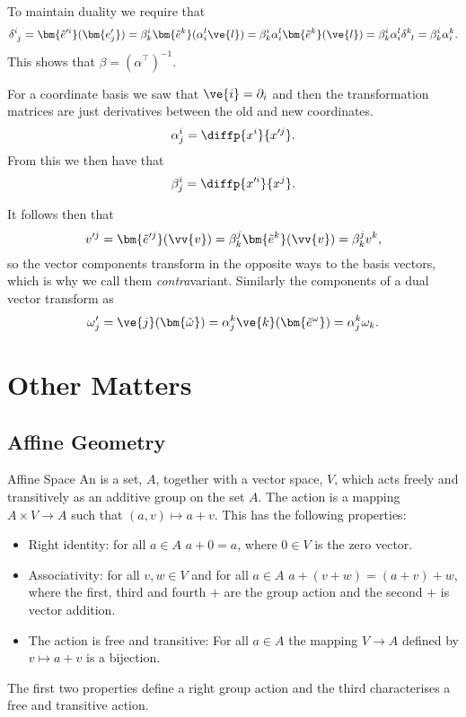\documentclass[fleqn]{NotesClass}
\newcommand*{\cv}[1]{\bm{\tilde{#1}}}
\newcommand*{\cve}[1]{\bm{\tilde{e}^{#1}}}
\newcommand*{\vep}[1]{\bm{e'_{#1}}}
\newcommand*{\cvep}[1]{\bm{\tilde{e}'^{#1}}}
\newcommand*{\trans}{\top}
\begin{document}
    To maintain duality we require that
    \begin{equation}
        \tensor{\delta}{^i_j} = \cvep{i}(\vep{j}) = \beta^i_k\cve{k}(\alpha^l_i\ve{l}) = \beta^i_k \alpha^l_i\cve{k}(\ve{l}) = \beta^i_k\alpha^l_i \tensor{\delta}{^k_l} = \beta^i_k\alpha^k_i.
    \end{equation}
    This shows that \(\beta = (\alpha^\trans)^{-1}\).
    
    For a coordinate basis we saw that \(\ve{i} = \partial_i\) and then the transformation matrices are just derivatives between the old and new coordinates.
    \begin{equation}
        \alpha^i_j = \diffp{x^i}{x'^j}.
    \end{equation}
    From this we then have that
    \begin{equation}
        \beta^i_j = \diffp{x'^i}{x^j}.
    \end{equation}
    
    It follows then that
    \begin{equation}
        v'^j = \cvep{j}(\vv{v}) = \beta^j_k \cve{k}(\vv{v}) = \beta^j_k v^k,
    \end{equation}
    so the vector components transform in the opposite ways to the basis vectors, which is why we call them \emph{contra}variant.
    Similarly the components of a dual vector transform as
    \begin{equation}
        \omega'_j = \ve{j}(\cv{\omega}) = \alpha^k_j \ve{k}(\cve{\omega}) = \alpha^k_j \omega_k.
    \end{equation}

    \section{Other Matters}
    \subsection{Affine Geometry}
    \begin{dfn}{Affine Space}{}
        An  is a set, \(A\), together with a vector space, \(V\), which acts freely and transitively as an additive group on the set \(A\).
        The action is a mapping \(A \times V \to A\) such that \((a, v) \mapsto a + v\).
        This has the following properties:
        \begin{itemize}
            \item Right identity: for all \(a \in A\) \(a + 0 = a\), where \(0 \in V\) is the zero vector.
            \item Associativity: for all \(v, w \in V\) and for all \(a \in A\) \(a + (v + w) = (a + v) + w\), where the first, third and fourth \(+\) are the group action and the second \(+\) is vector addition.
            \item The action is free and transitive: For all \(a \in A\) the mapping \(V \to  A\) defined by \(v \mapsto a + v\) is a bijection.
        \end{itemize}
        The first two properties define a right group action and the third characterises a free and transitive action.
    \end{dfn}
    
\end{document}

